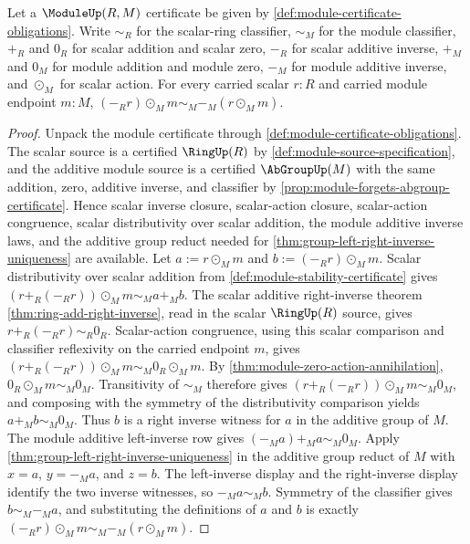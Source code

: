 \begin{theorem}\label{thm:module-scalar-negation-action-inverse} Let a $\ModuleUp(R,M)$ certificate be given by \autoref{def:module-certificate-obligations}. Write $\sim_R$ for the scalar-ring classifier, $\sim_M$ for the module classifier, $+_R$ and $0_R$ for scalar addition and scalar zero, $-_R$ for scalar additive inverse, $+_M$ and $0_M$ for module addition and module zero, $-_M$ for module additive inverse, and $\odot_M$ for scalar action. For every carried scalar $r:R$ and carried module endpoint $m:M$, $(-_R r)\odot_M m\sim_M -_M(r\odot_M m)$.\end{theorem} \begin{proof} Unpack the module certificate through \autoref{def:module-certificate-obligations}. The scalar source is a certified $\RingUp(R)$ by \autoref{def:module-source-specification}, and the additive module source is a certified $\AbGroupUp(M)$ with the same addition, zero, additive inverse, and classifier by \autoref{prop:module-forgets-abgroup-certificate}. Hence scalar inverse closure, scalar-action closure, scalar-action congruence, scalar distributivity over scalar addition, the module additive inverse laws, and the additive group reduct needed for \autoref{thm:group-left-right-inverse-uniqueness} are available. Let $a:=r\odot_M m$ and $b:=(-_R r)\odot_M m$. Scalar distributivity over scalar addition from \autoref{def:module-stability-certificate} gives $(r+_R(-_R r))\odot_M m\sim_M a+_M b$. The scalar additive right-inverse theorem \autoref{thm:ring-add-right-inverse}, read in the scalar $\RingUp(R)$ source, gives $r+_R(-_R r)\sim_R0_R$. Scalar-action congruence, using this scalar comparison and classifier reflexivity on the carried endpoint $m$, gives $(r+_R(-_R r))\odot_M m\sim_M0_R\odot_M m$. By \autoref{thm:module-zero-action-annihilation}, $0_R\odot_M m\sim_M0_M$. Transitivity of $\sim_M$ therefore gives $(r+_R(-_R r))\odot_M m\sim_M0_M$, and composing with the symmetry of the distributivity comparison yields $a+_M b\sim_M0_M$. Thus $b$ is a right inverse witness for $a$ in the additive group of $M$. The module additive left-inverse row gives $(-_M a)+_M a\sim_M0_M$. Apply \autoref{thm:group-left-right-inverse-uniqueness} in the additive group reduct of $M$ with $x=a$, $y=-_M a$, and $z=b$. The left-inverse display and the right-inverse display identify the two inverse witnesses, so $-_M a\sim_M b$. Symmetry of the classifier gives $b\sim_M-_M a$, and substituting the definitions of $a$ and $b$ is exactly $(-_R r)\odot_M m\sim_M -_M(r\odot_M m)$.\end{proof}
